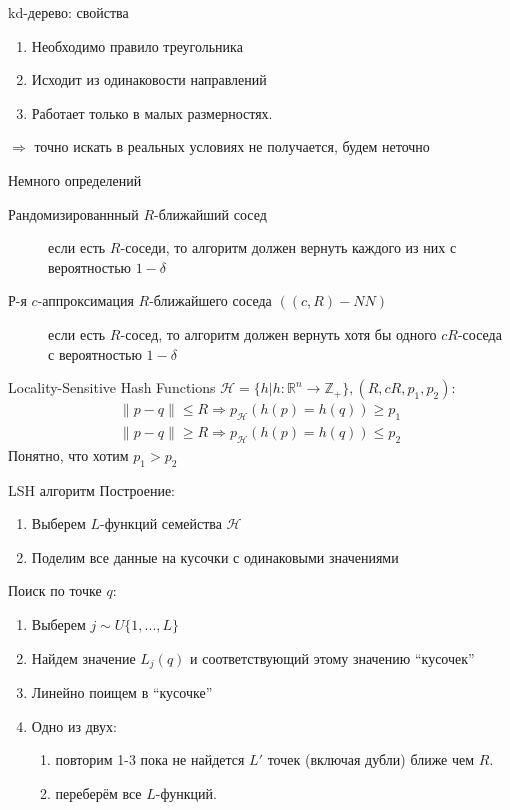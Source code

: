 \documentclass[14pt, fleqn, xcolor={dvipsnames, table}]{beamer}
\begin{document}
\begin{frame}{kd-дерево: свойства}
\begin{enumerate}
  \item Необходимо правило треугольника
  \item Исходит из одинаковости направлений
  \item Работает только в малых размерностях.
\end{enumerate}
$\Rightarrow$ точно искать в реальных условиях не получается, будем неточно
\end{frame}

\begin{frame}{Немного определений}
\small
\begin{description}
  \item [\color{blue}Рандомизированнный $R$-ближайший сосед] если есть $R$-соседи, то алгоритм должен вернуть каждого из них с вероятностью $1 - \delta$
  \item [\color{blue}Р-я $c$-аппроксимация $R$-ближайшего соседа $((c , R ) - NN )$] если есть $R$-сосед, то алгоритм должен вернуть хотя бы одного $cR$-соседа с вероятностью $1 - \delta$
\end{description}
\end{frame}

\begin{frame}{Locality-Sensitive Hash Functions}
$\mathcal{H} = \{h|h: \mathbb{R}^n \to \mathbb{Z}_+\}, (R,cR,p_1,p_2):$
$$\begin{array}{l}
  \|p-q\| \le R \Rightarrow p_{\mathcal{H}}(h(p)=h(q)) \ge p_1 \\
  \|p-q\| \ge R \Rightarrow p_{\mathcal{H}}(h(p)=h(q)) \le p_2
\end{array}$$
Понятно, что хотим $p_1 > p_2$
\end{frame}


\begin{frame}{LSH алгоритм}
\small
Построение:
\begin{enumerate}
  \item Выберем $L$-функций семейства $\mathcal{H}$
  \item Поделим все данные на кусочки с одинаковыми значениями
\end{enumerate}
Поиск по точке $q$:
\begin{enumerate}
  \item Выберем $j \sim U\{1,...,L\}$
  \item Найдем значение $L_j(q)$ и соответствующий этому значению “кусочек”
  \item Линейно поищем в “кусочке”
  \item Одно из двух:
  \begin{enumerate}
    \item повторим 1-3 пока не найдется $L'$ точек (включая дубли) ближе чем $R$.
    \item переберём все $L$-функций.
  \end{enumerate}
\end{enumerate}
\end{frame}
\end{document}
